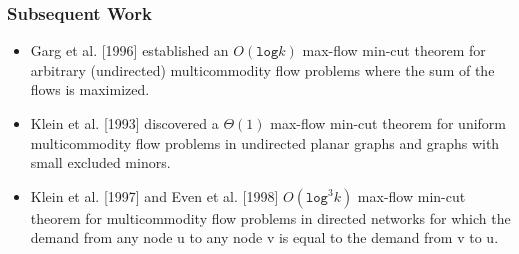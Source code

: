 \begin{frame}
\frametitle{Subsequent Work}
\begin{itemize}	
	\item Garg  et al. [1996] established an $O(\texttt{log} k)$  max-flow min-cut theorem for arbitrary (undirected) multicommodity flow problems where the sum of the flows is maximized. 
	\item Klein et al. [1993] discovered a $\Theta(1)$ max-flow min-cut theorem for uniform multicommodity flow problems in undirected planar graphs and graphs with small excluded minors.
	\item Klein et al. [1997] and Even et al. [1998] $O(\texttt{log}^3 k)$ max-flow min-cut theorem for multicommodity flow problems in directed networks for which the demand from any node u to any node v is equal to the demand from v to u. 
\end{itemize}
\end{frame}




